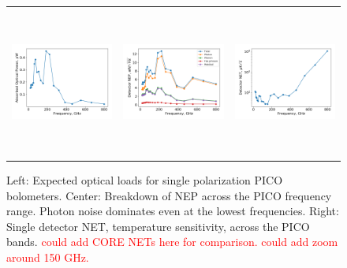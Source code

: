 \documentclass[]{spie}  %
\newcommand{\comr}[1]{\textcolor{red}{#1}}
\begin{document}
\begin{figure} [ht]
\begin{center}
\begin{tabular}{ccc} %
\hspace{-1.4cm} \includegraphics[height=4.9cm]{system_Popt.png} & \hspace{-0.7cm} \includegraphics[height=4.9cm]{system_NEP.png} &\hspace{-0.7cm}  \includegraphics[height=4.9cm]{system_NET.png} 
\end{tabular}
\end{center}
\caption{ \label{fig:popt} \label{fig:noise} \label{fig:net} 
Left: Expected optical loads for single polarization PICO bolometers. 
Center: Breakdown of NEP across the PICO frequency range.  Photon noise dominates even at the lowest frequencies. 
Right: Single detector NET, temperature sensitivity,  across the PICO bands. \comr{could add CORE NETs here for comparison. could add zoom around 150 GHz.}
}
\end{figure} 
\end{document}
